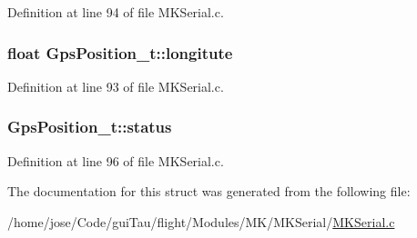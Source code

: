 Definition at line 94 of file M\-K\-Serial.\-c.

\hypertarget{struct_gps_position__t_abc6f957f20562e71c08d3866299e9004}{
\subsubsection[{longitute}]{\setlength{\rightskip}{0pt plus 5cm}float Gps\-Position\-\_\-t\-::longitute}}\label{struct_gps_position__t_abc6f957f20562e71c08d3866299e9004}


Definition at line 93 of file M\-K\-Serial.\-c.

\hypertarget{struct_gps_position__t_ad572bd9feb6186a48213e2db99c86883}{
\subsubsection[{status}]{ Gps\-Position\-\_\-t\-::status}}\label{struct_gps_position__t_ad572bd9feb6186a48213e2db99c86883}


Definition at line 96 of file M\-K\-Serial.\-c.



The documentation for this struct was generated from the following file\-:\begin{DoxyCompactItemize}
\item 
/home/jose/\-Code/gui\-Tau/flight/\-Modules/\-M\-K/\-M\-K\-Serial/\hyperlink{_m_k_serial_8c}{M\-K\-Serial.\-c}\end{DoxyCompactItemize}
